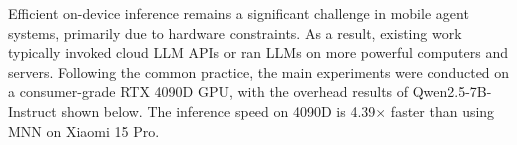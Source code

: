 Efficient on-device inference remains a significant challenge in mobile agent systems, primarily due to hardware constraints. As a result, existing work typically invoked cloud LLM APIs or ran LLMs on more powerful computers and servers. Following the common practice, the main experiments were conducted on a consumer-grade RTX 4090D GPU, with the overhead results of Qwen2.5-7B-Instruct shown below. The inference speed on 4090D is 4.39\(\times\) faster than using MNN on Xiaomi 15 Pro.
\begin{table}[h!]
\caption{Comparison of latency between baseline and local LLM deployments.}
\centering
{}
\end{table}